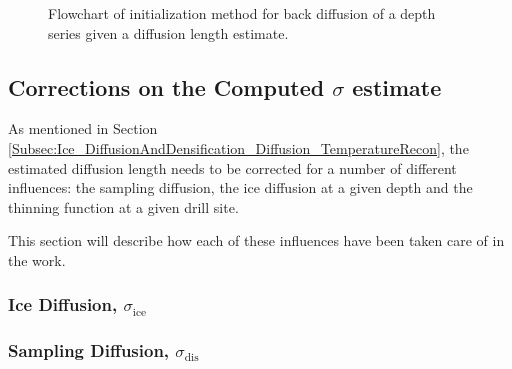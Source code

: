\documentclass[../../CompleteThesis2/Complete_2ndDraft]{subfiles}
\begin{document}
\begin{figure}
	\caption[Flowchart of initialization method.]{\small Flowchart of initialization method for back diffusion of a depth series given a diffusion length estimate.}
	\label{Fig:FlowchartBackDiffusion}
\end{figure}


\subsection[Corrections on $\sigma$][Corrections on $\sigma$]{Corrections on the Computed $\sigma$ estimate}
\label{Subsec:Method_SigmaMethod_SigmaCorrections}
As mentioned in Section \ref{Subsec:Ice_DiffusionAndDensification_Diffusion_TemperatureRecon}, the estimated diffusion length needs to be corrected for a number of different influences: the sampling diffusion, the ice diffusion at a given depth and the thinning function at a given drill site.

This section will describe how each of these influences have been taken care of in the work.

\subsubsection{Ice Diffusion, $\sigma_{\text{ice}}$}
\label{Subsubsec:Method_SigmaMethod_SigmaCorrections_IceDiffusion}

\subsubsection{Sampling Diffusion, $\sigma_{\text{dis}}$}
\label{Subsubsec:Method_SigmaMethod_SigmaCorrections_SamplingDiffusion}
\end{document}
